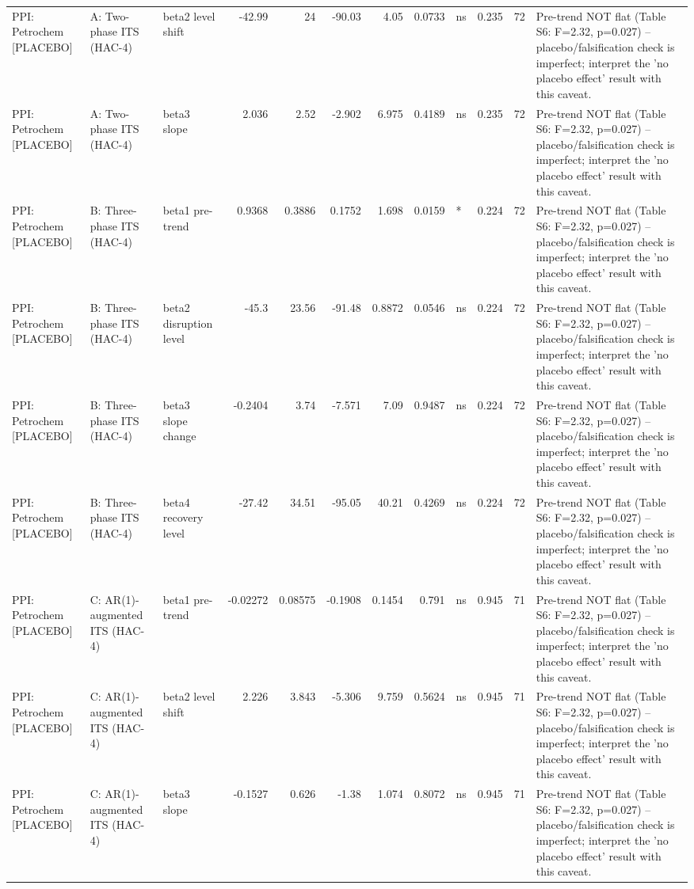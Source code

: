 \begin{table}
\begin{tabular}{lllrrrrrlrrl}
PPI: Petrochem [PLACEBO] & A: Two-phase ITS (HAC-4) & beta2 level shift & -42.99 & 24 & -90.03 & 4.05 & 0.0733 & ns & 0.235 & 72 & Pre-trend NOT flat (Table S6: F=2.32, p=0.027) -- placebo/falsification check is imperfect; interpret the 'no placebo effect' result with this caveat. \\
PPI: Petrochem [PLACEBO] & A: Two-phase ITS (HAC-4) & beta3 slope & 2.036 & 2.52 & -2.902 & 6.975 & 0.4189 & ns & 0.235 & 72 & Pre-trend NOT flat (Table S6: F=2.32, p=0.027) -- placebo/falsification check is imperfect; interpret the 'no placebo effect' result with this caveat. \\
PPI: Petrochem [PLACEBO] & B: Three-phase ITS (HAC-4) & beta1 pre-trend & 0.9368 & 0.3886 & 0.1752 & 1.698 & 0.0159 & * & 0.224 & 72 & Pre-trend NOT flat (Table S6: F=2.32, p=0.027) -- placebo/falsification check is imperfect; interpret the 'no placebo effect' result with this caveat. \\
PPI: Petrochem [PLACEBO] & B: Three-phase ITS (HAC-4) & beta2 disruption level & -45.3 & 23.56 & -91.48 & 0.8872 & 0.0546 & ns & 0.224 & 72 & Pre-trend NOT flat (Table S6: F=2.32, p=0.027) -- placebo/falsification check is imperfect; interpret the 'no placebo effect' result with this caveat. \\
PPI: Petrochem [PLACEBO] & B: Three-phase ITS (HAC-4) & beta3 slope change & -0.2404 & 3.74 & -7.571 & 7.09 & 0.9487 & ns & 0.224 & 72 & Pre-trend NOT flat (Table S6: F=2.32, p=0.027) -- placebo/falsification check is imperfect; interpret the 'no placebo effect' result with this caveat. \\
PPI: Petrochem [PLACEBO] & B: Three-phase ITS (HAC-4) & beta4 recovery level & -27.42 & 34.51 & -95.05 & 40.21 & 0.4269 & ns & 0.224 & 72 & Pre-trend NOT flat (Table S6: F=2.32, p=0.027) -- placebo/falsification check is imperfect; interpret the 'no placebo effect' result with this caveat. \\
PPI: Petrochem [PLACEBO] & C: AR(1)-augmented ITS (HAC-4) & beta1 pre-trend & -0.02272 & 0.08575 & -0.1908 & 0.1454 & 0.791 & ns & 0.945 & 71 & Pre-trend NOT flat (Table S6: F=2.32, p=0.027) -- placebo/falsification check is imperfect; interpret the 'no placebo effect' result with this caveat. \\
PPI: Petrochem [PLACEBO] & C: AR(1)-augmented ITS (HAC-4) & beta2 level shift & 2.226 & 3.843 & -5.306 & 9.759 & 0.5624 & ns & 0.945 & 71 & Pre-trend NOT flat (Table S6: F=2.32, p=0.027) -- placebo/falsification check is imperfect; interpret the 'no placebo effect' result with this caveat. \\
PPI: Petrochem [PLACEBO] & C: AR(1)-augmented ITS (HAC-4) & beta3 slope & -0.1527 & 0.626 & -1.38 & 1.074 & 0.8072 & ns & 0.945 & 71 & Pre-trend NOT flat (Table S6: F=2.32, p=0.027) -- placebo/falsification check is imperfect; interpret the 'no placebo effect' result with this caveat. \\
\bottomrule
\end{tabular}
\end{table}
